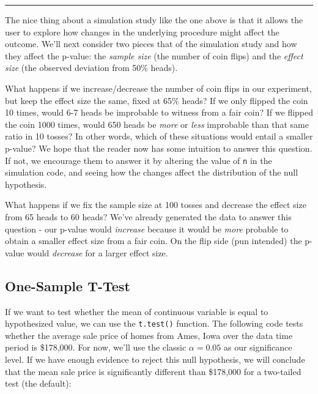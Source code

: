 \documentclass[
  letterpaper,
  DIV=11,
  numbers=noendperiod]{scrreprt}
\newenvironment{Shaded}{\begin{snugshade}}{\end{snugshade}}
\newcommand{\AttributeTok}[1]{\textcolor[rgb]{0.40,0.45,0.13}{#1}}
\newcommand{\DecValTok}[1]{\textcolor[rgb]{0.68,0.00,0.00}{#1}}
\newcommand{\FunctionTok}[1]{\textcolor[rgb]{0.28,0.35,0.67}{#1}}
\newcommand{\NormalTok}[1]{\textcolor[rgb]{0.00,0.23,0.31}{#1}}
\newcommand{\SpecialCharTok}[1]{\textcolor[rgb]{0.37,0.37,0.37}{#1}}
\begin{document}
\begin{center}\rule{0.5\linewidth}{0.5pt}\end{center}

The nice thing about a simulation study like the one above is that it
allows the user to explore how changes in the underlying procedure might
affect the outcome. We'll next consider two pieces that of the
simulation study and how they affect the p-value: the \emph{sample size}
(the number of coin flips) and the \emph{effect size} (the observed
deviation from 50\% heads).

What happens if we increase/decrease the number of coin flips in our
experiment, but keep the effect size the same, fixed at 65\% heads? If
we only flipped the coin 10 times, would 6-7 heads be improbable to
witness from a fair coin? If we flipped the coin 1000 times, would 650
heads be \emph{more} or \emph{less} improbable than that same ratio in
10 tosses? In other words, which of these situations would entail a
smaller p-value? We hope that the reader now has some intuition to
answer this question. If not, we encourage them to answer it by altering
the value of \texttt{n} in the simulation code, and seeing how the
changes affect the distribution of the null hypothesis.

What happens if we fix the sample size at 100 tosses and decrease the
effect size from 65 heads to 60 heads? We've already generated the data
to answer this question - our p-value would \emph{increase} because it
would be \emph{more} probable to obtain a smaller effect size from a
fair coin. On the flip side (pun intended) the p-value would
\emph{decrease} for a larger effect size.

\hypertarget{onesample}{%
\subsection{One-Sample T-Test}\label{onesample}}

If we want to test whether the mean of continuous variable is equal to
hypothesized value, we can use the \texttt{t.test()} function. The
following code tests whether the average sale price of homes from Ames,
Iowa over the data time period is \$178,000. For now, we'll use the
classic \(\alpha=0.05\) as our significance level. If we have enough
evidence to reject this null hypothesis, we will conclude that the mean
sale price is significantly different than \$178,000 for a two-tailed
test (the default):

\begin{Shaded}
\end{Shaded}
\end{document}

